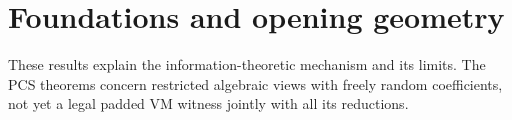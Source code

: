 \section{Foundations and opening geometry}\label{sec:foundations}

These results explain the information-theoretic mechanism and its limits. The PCS theorems concern restricted algebraic views with freely random coefficients, not yet a legal padded VM witness jointly with all its reductions.











